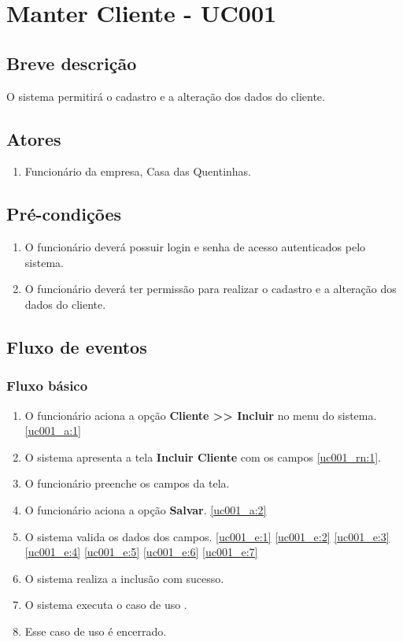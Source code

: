 \chapter{Manter Cliente - UC001} \label{uc001}
 
\section{Breve descrição}
 
O sistema permitirá o cadastro e a alteração dos dados do cliente.

\section{Atores}

\begin{enumerate}
	\item Funcionário da empresa, Casa das Quentinhas.
\end{enumerate}

\section{Pré-condições}

\begin{enumerate}
	\item O funcionário deverá possuir login e senha de acesso autenticados pelo sistema.
	\item O funcionário deverá ter permissão para realizar o cadastro e a alteração dos dados do cliente.
\end{enumerate}

\section{Fluxo de eventos}

\subsection{Fluxo básico}

\begin{enumerate}[label=P\arabic*]
	\item O funcionário aciona a opção \textbf{Cliente >> Incluir} no menu do sistema. \label{uc001_p:1}\ref{uc001_a:1}
	\item O sistema apresenta a tela \textbf{Incluir Cliente} com os campos \ref{uc001_rn:1}. \label{uc001_p:2}
	\item O funcionário preenche os campos da tela. \label{uc001_p:3}
	\item O funcionário aciona a opção \textbf{Salvar}. \label{uc001_p:4}\ref{uc001_a:2}
	\item O sistema valida os dados dos campos. \ref{uc001_e:1} \ref{uc001_e:2} \ref{uc001_e:3} \ref{uc001_e:4} \ref{uc001_e:5} \ref{uc001_e:6} \ref{uc001_e:7}
	\item O sistema realiza a inclusão com sucesso.
	\item O sistema executa o caso de uso .
	\item Esse caso de uso é encerrado.	
\end{enumerate}

